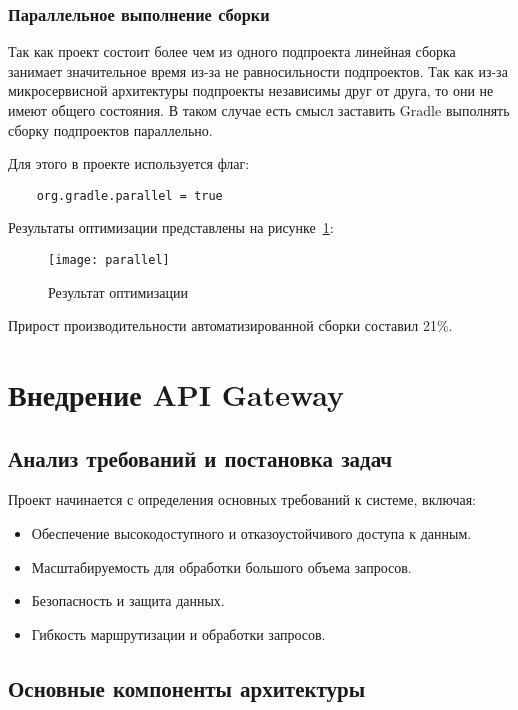\subsubsection{Параллельное выполнение сборки}

Так как проект состоит более чем из одного подпроекта линейная сборка занимает значительное время
из-за не равносильности подпроектов.
Так как из-за микросервисной архитектуры подпроекты независимы
друг от друга, то они не имеют общего состояния.
В таком случае есть смысл заставить Gradle
выполнять сборку подпроектов параллельно.

Для этого в проекте используется флаг:

\begin{lstlisting}
    org.gradle.parallel = true
\end{lstlisting}



Результаты оптимизации представлены на рисунке~\ref{fig:parallel}:

\begin{figure}[htbp]
    \centering
    \texttt{[image: parallel]}
    \caption{Результат оптимизации}
    \label{fig:parallel}
\end{figure}
Прирост производительности автоматизированной сборки составил 21\%.


\section{Внедрение API Gateway}

\subsection{Анализ требований и постановка задач}

Проект начинается с определения основных требований к системе, включая:

\begin{itemize}
    \item Обеспечение высокодоступного и отказоустойчивого доступа к данным.
    \item Масштабируемость для обработки большого объема запросов.
    \item Безопасность и защита данных.
    \item Гибкость маршрутизации и обработки запросов.
\end{itemize}

\subsection{Основные компоненты архитектуры}

